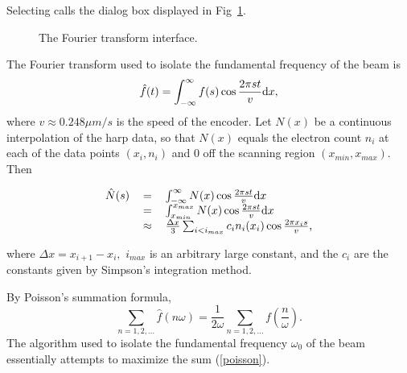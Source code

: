 Selecting  calls the dialog box displayed in Fig~\ref{fig:transform}.
\begin{figure}[htp]
\caption{The Fourier transform interface.}\label{fig:transform}
\end{figure}
The Fourier transform used to isolate the fundamental frequency of the beam is
\begin{equation}
\hat f(t)=\int_{-\infty}^\infty f(s)\cos \frac{2 \pi s t}{v} {\rm d}x,
\end{equation}
where $v\approx 0.248\mu m/s$ is the speed of the encoder.  Let $N(x)$ be a continuous interpolation of
the harp data, so that $N(x)$ equals the electron count $n_i$ at each of the data points $(x_i, n_i)$ and
0 off the scanning region $(x_{min}, x_{max})$. Then
\begin{center}
\begin{equation}
\begin{tabular}{rcl}
$\hat N(s)$&$=$&$\int_{-\infty}^\infty N(x)\cos \frac{2 \pi s t}{v} {\rm d}x$ \\
	   &$=$&$\int_{x_{min}}^{x_{max}} N(x)\cos \frac{2 \pi s t}{v} {\rm d}x $\\
	   &$\approx$&$ \frac{\Delta x}{3}\sum_{i<i_{max}} c_i n_i(x_i) \cos \frac{2 \pi x_i s}{v}$,
\end{tabular}
\end{equation}
\end{center}
where $\Delta x=x_{i+1}-x_i,$ $i_{max}$ is an arbitrary large constant, and the $c_i$ are the constants given
by Simpson's integration method.

By Poisson's summation formula, 
\begin{equation}\label{poisson}
\sum_{n=1, 2,\ldots} \hat f(n\omega) =
	\frac{1}{2\omega}\sum_{n=1, 2, \ldots} f\left(\frac{n}{\omega}\right).
\end{equation}
The algorithm used to isolate the fundamental frequency $\omega_0$ of the beam essentially attempts to
maximize the sum (\ref{poisson}).

